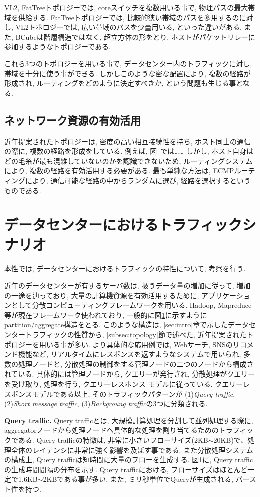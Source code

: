 \documentclass{ieicej}
\begin{document}
VL2, FatTreeトポロジーでは, coreスイッチを複数用いる事で, 物理パスの最大帯域を供給する.
FatTreeトポロジーでは, 比較的狭い帯域のパスを多用するのに対し, VL2トポロジーでは, 広い帯域のパスを少量用いる, といった違いがある.
また, BCubeは階層構造ではなく, 超立方体の形をとり, ホストがパケットリレーに参加するようなトポロジーである.

これら3つのトポロジーを用いる事で, データセンター内のトラフィックに対し, 帯域を十分に使う事ができる.
しかしこのような密な配置により, 複数の経路が形成され, ルーティングをどのように決定すべきか, という問題も生じる事となる.

\subsection{ネットワーク資源の有効活用}
近年提案されたトポロジーは, 密度の高い相互接続性を持ち, ホスト同士の通信の際に, 複数の経路を形成をしている.
例えば, 図~では\ldots\ldots
しかし, ホスト自身はどの毛糸が最も混雑していないのかを認識できないため, ルーティングシステムにより, 複数の経路を有効活用する必要がある.
最も単純な方法は, ECMPルーティングにより, 通信可能な経路の中からランダムに選び, 経路を選択するというものである.


\section{データセンターにおけるトラフィックシナリオ}
本性では, データセンターにおけるトラフィックの特性について, 考察を行う.

近年のデータセンターが有するサーバ数は, 扱うデータ量の増加に従って, 増加の一途を辿っており, 大量の計算機資源を有効活用するために,
アプリケーションとして分散コンピューティングフレームワークを用いる.
Hadoop, Mapreduce等が現在フレームワーク使われており, 一般的に図\ref{}に示すようにpartition/aggregate構造をとる.
このような構造は, \ref{sec:intro}章で示したデータセンタートラフィックの性質から, \ref{subsec:topology}節で述べた,
近年提案されたトポロジーを用いる事が多い.
より具体的な応用例では, Webサーチ, SNSのリコメンド機能など, リアルタイムにレスポンスを返すようなシステムで用いられ,
多数の処理ノードと, 分散処理の制御をする管理ノードの二つのノードから構成されている.
具体的には管理ノードから, クエリーが発行され, 分散処理がクエリーを受け取り, 処理を行う, クエリーレスポンス
モデルに従っている.
クエリーレスポンスモデルである以上, そのトラフィックパターンが  (1){\it Query traffic}, (2){\it Short message
traffic}, (3){\it Backgroung traffic}の3つに分類される.

{\bf Query traffic. }Query trafficとは, 大規模計算処理を分割して並列処理する際に,
aggregatorノードから処理ノードへ具体的な処理を割り当てるためのトラフィックである.
Query trafficの特徴は, 非常に小さいフローサイズ(2KB$\sim$20KB)で、処理全体のレイテンシに非常に強く影響を及ぼす事である.
また分散処理システムの構成上, Query trafficは短時間に大量のフローを生成する.
図\ref{}に, Query trafficの生成時間間隔の分布を示す\cite{dctcp}.
Query trafficにおける, フローサイズはほとんど一定で1.6KB$\sim$2KBである事が多い.
また, ミリ秒単位でQueryが生成される, バースト性を持つ.
\end{document}
